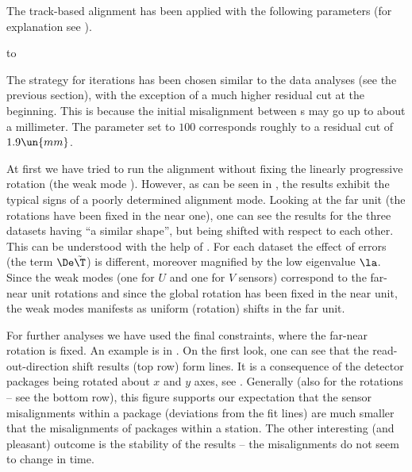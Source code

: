 The track-based alignment has been applied with the following parameters (for explanation see ).

\hbox to

\vskip1mm\noindent The strategy for iterations has been chosen similar to the  data analyses (see the previous section), with the exception of a much higher residual cut at the beginning. This is because the initial misalignment between s may go up to about a millimeter. The  parameter set to $100$ corresponds roughly to a residual cut of $1.9\un{mm}$.

At first we have tried to run the alignment without fixing the linearly progressive rotation (the weak mode ). However, as can be seen in , the results exhibit the typical signs of a poorly determined alignment mode. Looking at the far unit (the rotations have been fixed in the near one), one can see the results for the three datasets having ``a similar shape'', but being shifted with respect to each other. This can be understood with the help of . For each dataset the effect of errors (the term $\De\tilde\T$) is different, moreover magnified by the low eigenvalue $\la$. Since the weak modes (one for $U$ and one for $V$ sensors) correspond to the far-near unit rotations and since the global rotation has been fixed in the near unit, the weak modes manifests as uniform (rotation) shifts in the far unit.

For further analyses we have used the final constraints, where the far-near rotation is fixed. An example is in . On the first look, one can see that the read-out-direction shift results (top row) form lines. It is a consequence of the detector packages being rotated about $x$ and $y$ axes, see . Generally (also for the rotations -- see the bottom row), this figure supports our expectation that the sensor misalignments within a package (deviations from the fit lines) are much smaller that the misalignments of  packages within a station. The other interesting (and pleasant) outcome is the stability of the results -- the misalignments do not seem to change in time.

